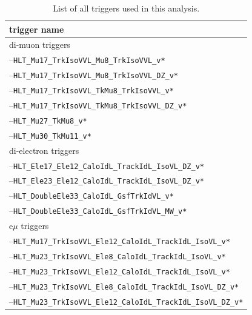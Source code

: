     \begin{table}[htb]
      \begin{center}
      \caption{\label{table:triggers} List of all triggers used in this analysis. }
        \begin{tabular}{l}
          \hline
          \hline
          trigger name       \\
          \hline
          di-muon triggers \\
          \hline
          --\verb=HLT_Mu17_TrkIsoVVL_Mu8_TrkIsoVVL_v*=                \\
          --\verb=HLT_Mu17_TrkIsoVVL_Mu8_TrkIsoVVL_DZ_v*=                \\
          --\verb=HLT_Mu17_TrkIsoVVL_TkMu8_TrkIsoVVL_v*=              \\
          --\verb=HLT_Mu17_TrkIsoVVL_TkMu8_TrkIsoVVL_DZ_v*=              \\
          --\verb=HLT_Mu27_TkMu8_v*=                                  \\
          --\verb=HLT_Mu30_TkMu11_v*=                                  \\
          \hline
          di-electron triggers \\
          \hline
          --\verb=HLT_Ele17_Ele12_CaloIdL_TrackIdL_IsoVL_DZ_v*=       \\
          --\verb=HLT_Ele23_Ele12_CaloIdL_TrackIdL_IsoVL_DZ_v*=       \\
          --\verb=HLT_DoubleEle33_CaloIdL_GsfTrkIdVL_v*=           \\
          --\verb=HLT_DoubleEle33_CaloIdL_GsfTrkIdVL_MW_v*=           \\
          \hline
          e$\mu$ triggers \\
          \hline
          --\verb=HLT_Mu17_TrkIsoVVL_Ele12_CaloIdL_TrackIdL_IsoVL_v*= \\
          --\verb=HLT_Mu23_TrkIsoVVL_Ele8_CaloIdL_TrackIdL_IsoVL_v*= \\
          --\verb=HLT_Mu23_TrkIsoVVL_Ele12_CaloIdL_TrackIdL_IsoVL_v*= \\
          --\verb=HLT_Mu23_TrkIsoVVL_Ele8_CaloIdL_TrackIdL_IsoVL_DZ_v*= \\
          --\verb=HLT_Mu23_TrkIsoVVL_Ele12_CaloIdL_TrackIdL_IsoVL_DZ_v*= \\

\end{tabular}
\end{center}
\end{table}
